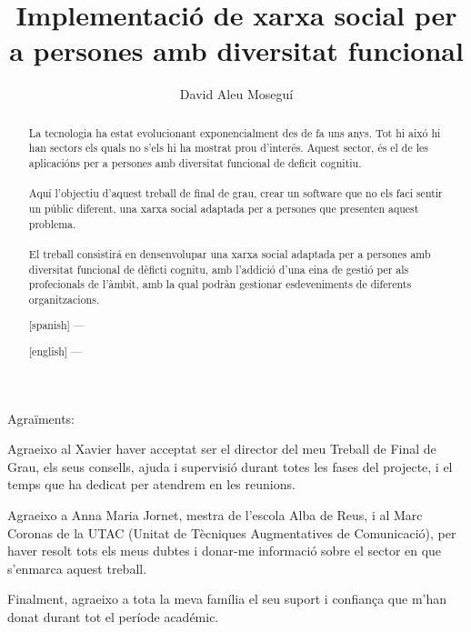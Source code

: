 \documentclass[11pt,catalan,listoffigures,listoftables]{tfgetsinf}
\title{Implementació de xarxa social per a persones amb diversitat funcional}
\author{David Aleu Moseguí}
\begin{document}
\begin{center}
\begin{LARGE}
Agraïments:
\end{LARGE}
\end{center}
\begin{center}
Agraeixo al Xavier haver acceptat ser el director del meu Treball de Final de Grau, els seus consells, ajuda i supervisió durant totes les fases del projecte, i el temps que ha dedicat per atendrem en les reunions.
\end{center}
\begin{center}
Agraeixo a Anna Maria Jornet, mestra de l'escola Alba de Reus, i al Marc Coronas de la UTAC (Unitat de Tècniques Augmentatives de Comunicació), per haver resolt tots els meus dubtes i donar-me informació sobre el sector en que s'enmarca aquest treball.
\end{center}
\begin{center}
Finalment, agraeixo a tota la meva família el seu suport i confiança que m'han donat durant tot el període académic.
\end{center}
\clearpage
\begin{abstract}
\noindent La tecnologia ha estat evolucionant exponencialment des de fa uns anys. Tot hi aixó hi han sectors els quals no s'els hi ha mostrat prou d'interés. Aquest sector, és el de les aplicacións per a persones amb diversitat funcional de deficit cognitiu.\\ \\
Aquí l'objectiu d'aquest treball de final de grau, crear un software que no els faci sentir un públic diferent, una xarxa social adaptada per a persones que presenten aquest problema.\\ \\
El treball consistirá en densenvolupar una xarxa social adaptada per a persones amb diversitat funcional de dèficti cognitu, amb l'addició d'una eina de gestió per als profecionals de l'àmbit, amb la qual podràn gestionar esdeveniments de diferents organitzacions.
\end{abstract}
\begin{abstract}[spanish]
---
\end{abstract}
\begin{abstract}[english]
---
\end{abstract}
\end{document}
